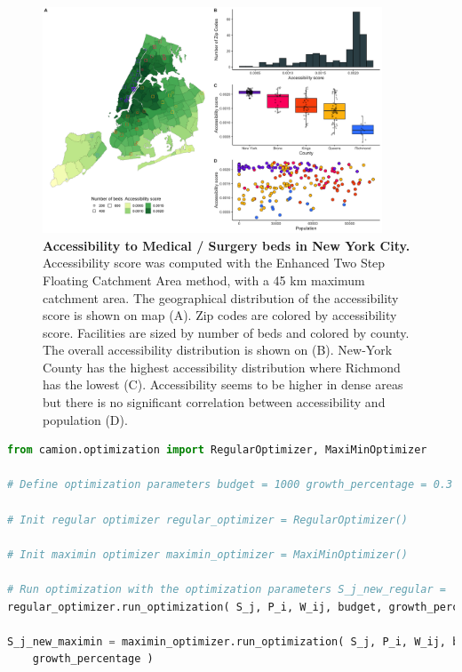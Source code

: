 \begin{figure}[H]
    \includegraphics[width=0.9\textwidth]{images/camion-ny/fig2.png}
    \centering
    \caption{ \textbf{Accessibility to Medical / Surgery beds in New York City.}
        Accessibility score was computed with the Enhanced Two Step Floating
        Catchment Area method, with a 45 km maximum catchment area. The
        geographical distribution of the accessibility score is shown on map
        (A). Zip codes are colored by accessibility score. Facilities are sized
        by number of beds and colored by county. The overall accessibility
        distribution is shown on (B). New-York County has the highest
        accessibility distribution where Richmond has the lowest (C).
        Accessibility seems to be higher in dense areas but there is no
        significant correlation between accessibility and population (D). }
    \label{fig:camion-ny-accessibility}
\end{figure}

\begin{minipage}{\textwidth}
    \begin{lstlisting}[language=Python, caption=Optimize accessibility with \ac{camion}]
from camion.optimization import RegularOptimizer, MaxiMinOptimizer

# Define optimization parameters budget = 1000 growth_percentage = 0.3

# Init regular optimizer regular_optimizer = RegularOptimizer()

# Init maximin optimizer maximin_optimizer = MaxiMinOptimizer()

# Run optimization with the optimization parameters S_j_new_regular =
regular_optimizer.run_optimization( S_j, P_i, W_ij, budget, growth_percentage )

S_j_new_maximin = maximin_optimizer.run_optimization( S_j, P_i, W_ij, budget,
    growth_percentage )
\end{lstlisting}
\end{minipage}

